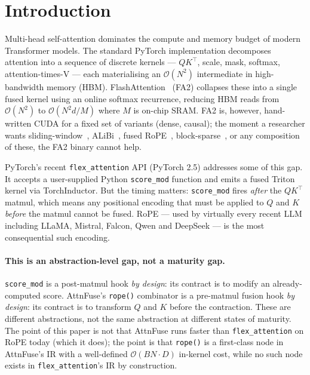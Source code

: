 \documentclass[10pt,twocolumn]{article}
\begin{document}
\section{Introduction}
\label{sec:intro}

Multi-head self-attention dominates the compute and memory budget of
modern Transformer models. The standard PyTorch implementation
decomposes attention into a sequence of discrete kernels --- $QK^\top$,
scale, mask, softmax, attention-times-V --- each materialising an
$\mathcal{O}(N^2)$ intermediate in high-bandwidth memory (HBM).
FlashAttention~\cite{dao2022flashattention,dao2023flashattention2}
(FA2) collapses these into a single fused kernel using an online
softmax recurrence, reducing HBM reads from $\mathcal{O}(N^2)$ to
$\mathcal{O}(N^2 d / M)$ where $M$ is on-chip SRAM. FA2 is, however,
hand-written CUDA for a fixed set of variants (dense, causal); the
moment a researcher wants
sliding-window~\cite{child2019generating},
ALiBi~\cite{press2021alibi}, fused RoPE~\cite{su2021roformer},
block-sparse~\cite{zaheer2020bigbird}, or any composition of these,
the FA2 binary cannot help.

PyTorch's recent \texttt{flex\_attention} API (PyTorch 2.5)
addresses some of this gap. It accepts a user-supplied Python
\texttt{score\_mod} function and emits a fused Triton kernel via
TorchInductor. But the timing matters: \texttt{score\_mod} fires
\emph{after} the $QK^\top$ matmul, which means any positional
encoding that must be applied to $Q$ and $K$ \emph{before} the
matmul cannot be fused. RoPE --- used by virtually every recent LLM
including LLaMA, Mistral, Falcon, Qwen and DeepSeek --- is the most
consequential such encoding.

\paragraph{This is an abstraction-level gap, not a maturity gap.}
\texttt{score\_mod} is a post-matmul hook \emph{by design}: its
contract is to modify an already-computed score. AttnFuse's
\texttt{rope()} combinator is a pre-matmul fusion hook
\emph{by design}: its contract is to transform $Q$ and $K$ before
the contraction. These are different abstractions, not the same
abstraction at different states of maturity. The point of this
paper is not that AttnFuse runs faster than \texttt{flex\_attention}
on RoPE today (which it does); the point is that \texttt{rope()} is
a first-class node in AttnFuse's IR with a well-defined
$\mathcal{O}(BN \cdot D)$ in-kernel cost, while no such node exists
in \texttt{flex\_attention}'s IR by construction.
\end{document}

